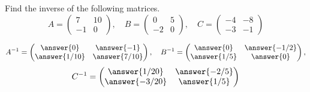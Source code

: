 \documentclass{ximera}
\author{Parisa Fatheddin}
\begin{document}
\begin{exercise}
Find the inverse of the following matrices.
\[
A= \begin{pmatrix}
  7 & 10   \\
  -1 &  0
\end{pmatrix}, \quad
B= \begin{pmatrix}
  0 & 5   \\
  -2 &  0
\end{pmatrix}, \quad
C= \begin{pmatrix}
  -4 & -8   \\
  -3 &  -1
\end{pmatrix}
\]
\begin{prompt}
\[A^{-1}=  \begin{pmatrix}
  \answer{0} & \answer{-1}   \\
  \answer{1/10} & \answer{7/10}  
\end{pmatrix},\quad  B^{-1}=  \begin{pmatrix}
  \answer{0} & \answer{-1/2}   \\
  \answer{1/5} & \answer{0}  
\end{pmatrix},
\]
\[ C^{-1}=  \begin{pmatrix}
  \answer{1/20} & \answer{-2/5}   \\
  \answer{-3/20} & \answer{1/5}  
\end{pmatrix}
\]
\end{prompt}
\end{exercise}
\end{document}
